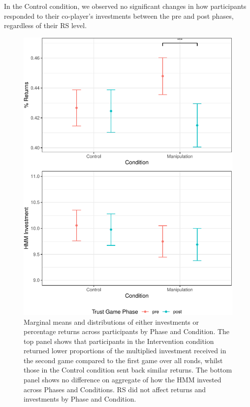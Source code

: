 \documentclass[
]{article}
\begin{document}
In the Control condition, we observed no significant changes in how
participants responded to their co-player's investments between the pre
and post phases, regardless of their RS level.

\begin{figure}

{\centering \includegraphics[width=\textwidth]{article_files/figure-latex/boxPlots-1} 

}

\caption{Marginal means and distributions of either investments or percentage returns across participants by Phase and Condition. The top panel shows that participants in the Intervention condition returned lower proportions of the multiplied investment received in the second game compared to the first game over all ronds, whilst those in the Control condition sent back similar returns. The bottom panel shows no difference on aggregate of how the HMM invested across Phases and Conditions. RS did not affect returns and investments by Phase and Condition.}\label{fig:boxPlots}
\end{figure}
\end{document}
